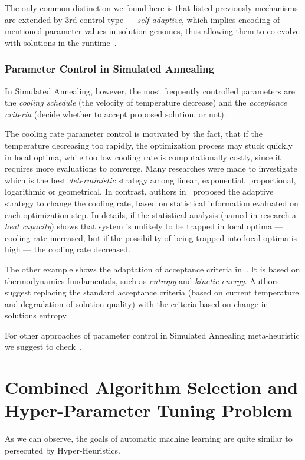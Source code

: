 The only common distinction we found here is that listed previously mechanisms are extended by 3rd control type — \textit{self-adaptive}, which implies encoding of mentioned parameter values in solution genomes, thus allowing them to co-evolve with solutions in the runtime~\cite{doerr2020theory}.

\subsubsection{Parameter Control in Simulated Annealing}\label{bg: parameter control: SA}
In Simulated Annealing, however, the most frequently controlled parameters are the \textit{cooling schedule} (the velocity of temperature decrease) and the \textit{acceptance criteria} (decide whether to accept proposed solution, or not).

The cooling rate parameter control is motivated by the fact, that if the temperature decreasing too rapidly, the optimization process may stuck quickly in local optima, while too low cooling rate is computationally costly, since it requires more evaluations to converge. Many researches were made to investigate which is the best \textit{deterministic} strategy among linear, exponential, proportional, logarithmic or geometrical. In contrast, authors in~\cite{karabin2020simulated} proposed the adaptive strategy to change the cooling rate, based on statistical information evaluated on each optimization step. In details, if the statistical analysis (named in research a \textit{heat capacity}) shows that system is unlikely to be trapped in local optima — cooling rate increased, but if the possibility of being trapped into local optima is high — the cooling rate decreased.

The other example shows the adaptation of acceptance criteria in~\cite{ghandeshtani2019entropy}. It is based on thermodynamics fundamentals, such as \textit{entropy} and \textit{kinetic energy}. Authors suggest replacing the standard acceptance criteria (based on current temperature and degradation of solution quality) with the criteria based on change in solutions entropy.

For other approaches of parameter control in Simulated Annealing meta-heuristic we suggest to check~\cite{ingber2000adaptive,de2003placement}.


\section{Combined Algorithm Selection and Hyper-Parameter Tuning Problem}\label{bg: section cash}
As we can observe, the goals of automatic machine learning are quite similar to persecuted by Hyper-Heuristics.


